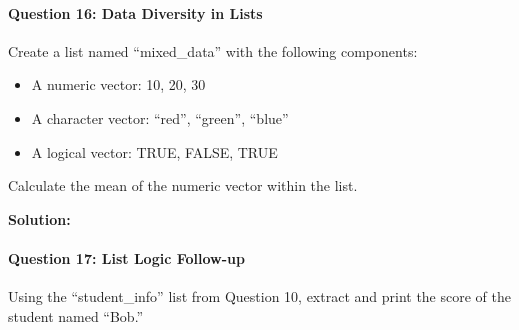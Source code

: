 \documentclass[
]{article}
\newenvironment{Shaded}{\begin{snugshade}}{\end{snugshade}}
\newcommand{\AttributeTok}[1]{\textcolor[rgb]{0.13,0.29,0.53}{#1}}
\newcommand{\ConstantTok}[1]{\textcolor[rgb]{0.56,0.35,0.01}{#1}}
\newcommand{\DecValTok}[1]{\textcolor[rgb]{0.00,0.00,0.81}{#1}}
\newcommand{\FunctionTok}[1]{\textcolor[rgb]{0.13,0.29,0.53}{\textbf{#1}}}
\newcommand{\NormalTok}[1]{#1}
\newcommand{\OtherTok}[1]{\textcolor[rgb]{0.56,0.35,0.01}{#1}}
\newcommand{\SpecialCharTok}[1]{\textcolor[rgb]{0.81,0.36,0.00}{\textbf{#1}}}
\newcommand{\StringTok}[1]{\textcolor[rgb]{0.31,0.60,0.02}{#1}}
\begin{document}
\hypertarget{question-16-data-diversity-in-lists}{%
\paragraph{Question 16: Data Diversity in
Lists}\label{question-16-data-diversity-in-lists}}

Create a list named ``mixed\_data'' with the following components:

\begin{itemize}
\item
  A numeric vector: 10, 20, 30
\item
  A character vector: ``red'', ``green'', ``blue''
\item
  A logical vector: TRUE, FALSE, TRUE
\end{itemize}

Calculate the mean of the numeric vector within the list.

\textbf{Solution:}

\begin{Shaded}
\end{Shaded}

\hypertarget{question-17-list-logic-follow-up}{%
\paragraph{Question 17: List Logic
Follow-up}\label{question-17-list-logic-follow-up}}

Using the ``student\_info'' list from Question 10, extract and print the
score of the student named ``Bob.''
\end{document}

